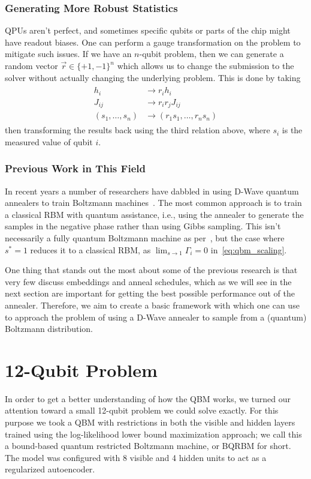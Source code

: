 \subsubsection{Generating More Robust Statistics}\label{sec:gauge}
QPUs aren't perfect, and sometimes specific qubits or parts of the chip might have readout biases.
One can perform a gauge transformation on the problem to mitigate such issues.
If we have an \( n \)-qubit problem, then we can generate a random vector \( \vec{r} \in \{+1, -1\}^n \) which allows us to change the submission to the solver without actually changing the underlying problem.
This is done by taking
\begin{align}
\begin{split}
    h_i
        &\rightarrow r_i h_i \\
    J_{ij}
        &\rightarrow r_i r_j J_{ij} \\
    (s_1, \dots, s_n)
        &\rightarrow (r_1 s_1, \dots, r_n s_n)
\end{split}
\end{align}
then transforming the results back using the third relation above, where \( s_i \) is the measured value of qubit \( i \).

\subsubsection{Previous Work in This Field}
In recent years a number of researchers have dabbled in using D-Wave quantum annealers to train Boltzmann machines~\cite{adachi_2015,benedetti_2016,anschuetz_2019,wiebe_2019,rocutto_2020,dixit_2021,ilmo_2021,wilson_2021,xu_2021}.
The most common approach is to train a classical RBM with quantum assistance, i.e., using the annealer to generate the samples in the negative phase rather than using Gibbs sampling.
This isn't necessarily a fully quantum Boltzmann machine as per~\cite{amin_2018}, but the case where \( s^* = 1 \) reduces it to a classical RBM, as \( \lim_{s\rightarrow 1} \Gamma_i = 0 \) in~\cref{eq:qbm_scaling}.

One thing that stands out the most about some of the previous research is that very few discuss embeddings and anneal schedules, which as we will see in the next section are important for getting the best possible performance out of the annealer.
Therefore, we aim to create a basic framework with which one can use to approach the problem of using a D-Wave annealer to sample from a (quantum) Boltzmann distribution.

\section{12-Qubit Problem}\label{sec:qbm_12_qubit_problem}
In order to get a better understanding of how the QBM works, we turned our attention toward a small 12-qubit problem we could solve exactly.
For this purpose we took a QBM with restrictions in both the visible and hidden layers trained using the log-likelihood lower bound maximization approach; we call this a bound-based quantum restricted Boltzmann machine, or BQRBM for short.
The model was configured with 8 visible and 4 hidden units to act as a regularized autoencoder.

